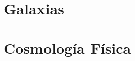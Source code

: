 \documentclass{tufte-handout}
\newcommand{\doccmd}[1]{\texttt{\textbackslash#1}}%
\newcommand{\docopt}[1]{\ensuremath{\langle}\textrm{\textit{#1}}\ensuremath{\rangle}}%
\newcommand{\docarg}[1]{\textrm{\textit{#1}}}%
\newenvironment{docspec}{\begin{quote}\noindent}{\end{quote}}%
\begin{document}
\clearpage

\section{Galaxias}

\clearpage

\section{Cosmología Física}

\clearpage




\end{document}
